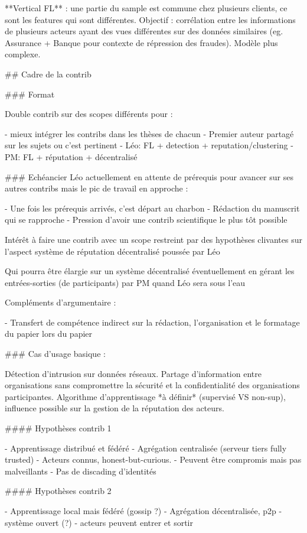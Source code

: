 \documentclass{article}
\begin{document}
\begin{markdown}
**Vertical FL** : une partie du sample est commune chez plusieurs clients, ce sont les features qui sont différentes.
Objectif : corrélation entre les informations de plusieurs acteurs ayant des vues différentes sur des données similaires (eg. Assurance + Banque pour contexte de répression des fraudes).
Modèle plus complexe.


## Cadre de la contrib

### Format

Double contrib sur des scopes différents pour : 

- mieux intégrer les contribs dans les thèses de chacun 
- Premier auteur partagé sur les sujets ou c'est pertinent 
    - Léo: FL + detection + reputation/clustering
    - PM: FL + réputation + décentralisé

### Echéancier 
Léo actuellement en attente de prérequis pour avancer sur ses autres contribs mais le pic de travail en approche : 

- Une fois les prérequis arrivés, c'est départ au charbon
- Rédaction du manuscrit qui se rapproche 
- Pression d'avoir une contrib scientifique le plus tôt possible

 Intérêt à faire une contrib avec un scope restreint par des hypothèses clivantes sur l'aspect système de réputation décentralisé poussée par Léo
 
 Qui pourra être élargie sur un système décentralisé éventuellement en gérant les entrées-sorties (de participants) par PM quand Léo sera sous l'eau

Compléments d'argumentaire :

- Transfert de compétence indirect sur la rédaction, l'organisation et le formatage du papier lors du papier

### Cas d'usage basique : 

Détection d'intrusion sur données réseaux. Partage d'information entre organisations sans compromettre la sécurité et la confidentialité des organisations participantes. Algorithme d'apprentissage *à définir* (supervisé VS non-sup), influence possible sur la gestion de la réputation des acteurs.

#### Hypothèses contrib 1

- Apprentissage distribué et fédéré 
- Agrégation centralisée (serveur tiers fully trusted)
- Acteurs connus, honest-but-curious.
    - Peuvent être compromis mais pas malveillants
	- Pas de discading d'identités 

#### Hypothèses contrib 2

- Apprentissage local mais fédéré (gossip ?)
- Agrégation décentralisée, p2p
- système ouvert (?)
    - acteurs peuvent entrer et sortir


\end{markdown}
\end{document}
